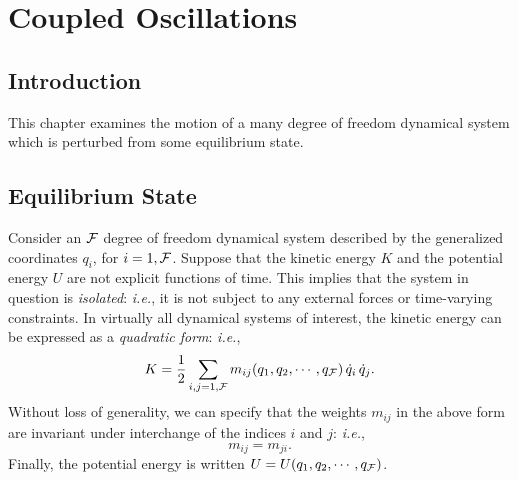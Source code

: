 \chapter{Coupled Oscillations}
\section{Introduction} 
This chapter examines the motion of a many degree of
freedom dynamical system which is perturbed from some equilibrium state.

\section{Equilibrium State}
Consider an ${\cal F}$ degree of freedom dynamical system described by the
generalized coordinates $q_i$, for $i=1,{\cal F}$. Suppose that the
kinetic energy $K$ and the potential energy $U$ are not explicit
functions of time. This implies that the system in question
is {\em isolated}: {\em i.e.}, it is not subject to any external forces or
time-varying constraints. In virtually all dynamical systems of interest, the kinetic
energy can be expressed as a {\em quadratic form}: {\em i.e.}, 
\begin{equation}\label{e12.1}
K = \frac{1}{2}\sum_{i,j=1,{\cal F}} m_{ij}(q_1,q_2,\cdots, q_{\cal F})\,\dot{q}_i\,\dot{q}_j.
\end{equation}
Without loss of generality, we can specify that the weights $m_{ij}$ in the above form are
invariant under interchange of the indices $i$ and $j$: {\em i.e.},
\begin{equation}
m_{ij} = m_{ji}.
\end{equation}
Finally, the potential energy is written $U=U(q_1,q_2,\cdots, q_{\cal F})$. 

